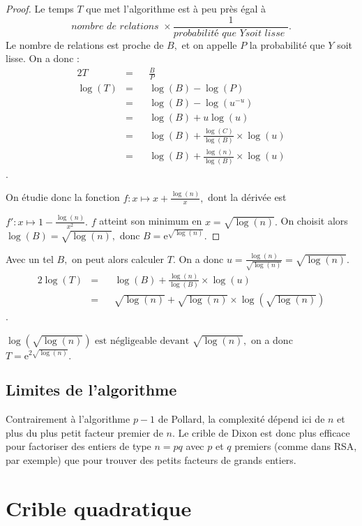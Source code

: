 \documentclass[french, 12pt, titlepage]{article}
\begin{document}
\begin{proof}

Le temps $T$ que met l'algorithme est à peu près égal à
\[\textit{nombre de relations } \times \frac{1}{\textit{probabilité que
  } Y \textit{soit lisse }}.\] Le nombre de relations est proche de $B,$ et on
appelle $P$ la probabilité que $Y$ soit lisse. On a donc : 
\begin{alignat*}{2}
T & = && \frac{B}{P} \\
\log(T) & = && \log(B) - \log(P) \\
 & = && \log(B) - \log(u^{-u}) \\
 & = && \log(B) + u\log(u) \\
 & = && \log(B) + \frac{\log(C)}{\log(B)} \times \log(u) \\
 & = && \log(B) + \frac{\log(n)}{\log(B)} \times \log(u)
\end{alignat*}.     

On étudie donc la fonction $f : x \mapsto x + \frac{\log(n)}{x},$ dont
la dérivée est 

\noindent $f' : x \mapsto 1 - \frac{\log(n)}{x^2}.$ $f$ atteint
son minimum en $x = \sqrt{\log(n)}.$ On choisit alors $\log(B) = \sqrt{\log(n)},$ donc $B = \text{e}^{\sqrt{\log(n)}}.$ 
\end{proof}

Avec un tel $B,$ on peut alors calculer $T.$ On a donc $u = \frac{\log(n)}{\sqrt{\log(n)}} = \sqrt{\log(n)}.$
\begin{alignat*}{2}
\log(T) & = && \log(B) + \frac{\log(n)}{\log(B)} \times \log(u) \\
 & = && \sqrt{\log(n)} + \sqrt{\log(n)} \times \log(\sqrt{\log(n)}) 
\end{alignat*}.

$\log(\sqrt{\log(n)}) \text{ est négligeable devant } \sqrt{\log(n)},$ on a donc $T = \text{e}^{2\sqrt{\log(n)}}.$

\subsection{Limites de l'algorithme}

Contrairement à l'algorithme $p - 1$ de Pollard, la complexité dépend
ici de $n$ et plus du plus petit facteur premier de $n.$ Le crible de
Dixon est donc plus efficace pour factoriser des entiers de type $n =
pq$ avec $p$ et $q$ premiers (comme dans RSA, par exemple) que pour trouver des petits facteurs de
grands entiers.


\section{Crible quadratique}
\end{document}
